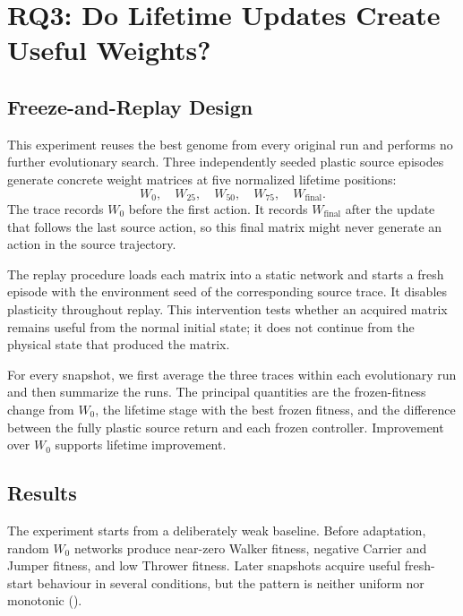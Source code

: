 \section{RQ3: Do Lifetime Updates Create Useful Weights?}
\label{sec:rq3}

\subsection{Freeze-and-Replay Design}

This experiment reuses the best \nchl{} genome from every original run and performs no further evolutionary search. Three independently seeded plastic source episodes generate concrete weight matrices at five normalized lifetime positions:
\begin{equation}
  W_0,\quad W_{25},\quad W_{50},\quad W_{75},\quad W_{\mathrm{final}}.
\end{equation}
The trace records $W_0$ before the first action. It records $W_{\mathrm{final}}$ after the update that follows the last source action, so this final matrix might never generate an action in the source trajectory.

The replay procedure loads each matrix into a static network and starts a fresh episode with the environment seed of the corresponding source trace. It disables plasticity throughout replay. This intervention tests whether an acquired matrix remains useful from the normal initial state; it does not continue from the physical state that produced the matrix.

For every snapshot, we first average the three traces within each evolutionary run and then summarize the runs. The principal quantities are the frozen-fitness change from $W_0$, the lifetime stage with the best frozen fitness, and the difference between the fully plastic source return and each frozen controller. Improvement over $W_0$ supports lifetime improvement.

\subsection{Results}

The experiment starts from a deliberately weak baseline. Before adaptation, random $W_0$ networks produce near-zero Walker fitness, negative Carrier and Jumper fitness, and low Thrower fitness. Later snapshots acquire useful fresh-start behaviour in several conditions, but the pattern is neither uniform nor monotonic ().

